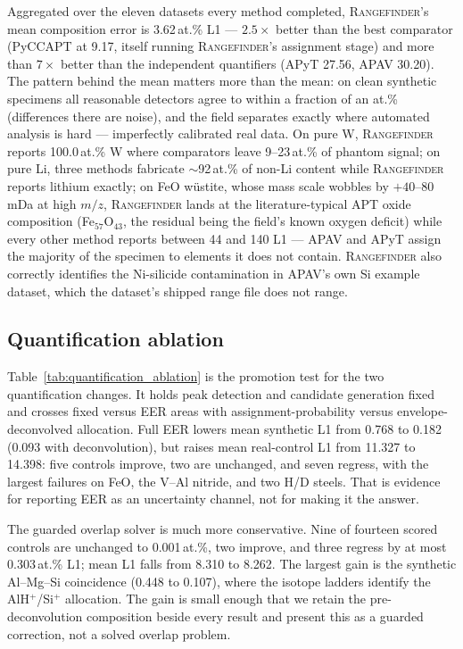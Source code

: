 \documentclass[11pt]{article}
\newcommand{\rf}{\textsc{Rangefinder}}
\begin{document}
Aggregated over the eleven datasets every method completed, \rf{}'s mean
composition error is 3.62\,at.\% L1 --- $2.5\times$ better than the best
comparator (PyCCAPT at 9.17, itself running \rf{}'s assignment stage) and
more than $7\times$ better than the independent quantifiers (APyT 27.56,
APAV 30.20). The pattern behind the mean matters more than the mean: on clean
synthetic specimens all reasonable detectors agree to within a fraction
of an at.\% (differences there are noise), and the field separates
exactly where automated analysis is hard --- imperfectly calibrated real
data. On pure W, \rf{} reports 100.0\,at.\% W where comparators leave
9--23\,at.\% of phantom signal; on pure Li, three methods fabricate
$\sim$92\,at.\% of non-Li content while \rf{} reports lithium exactly;
on FeO w\"ustite, whose mass scale wobbles by $+40$--$80$\,mDa at high
$m/z$, \rf{} lands at the literature-typical APT oxide composition
(Fe$_{57}$O$_{43}$, the residual being the field's known oxygen deficit)
while every other method reports between 44 and 140 L1 --- APAV and APyT
assign the majority of the specimen to elements it does not contain.
\rf{} also correctly identifies the Ni-silicide contamination in APAV's
own Si example dataset, which the dataset's shipped range file does not
range.

\subsection{Quantification ablation}
Table~\ref{tab:quantification_ablation} is the promotion test for the two
quantification changes. It holds peak detection and candidate generation
fixed and crosses fixed versus EER areas with assignment-probability versus
envelope-deconvolved allocation. Full EER lowers mean synthetic L1 from
0.768 to 0.182 (0.093 with deconvolution), but raises mean real-control L1
from 11.327 to 14.398: five controls improve, two are unchanged, and seven
regress, with the largest failures on FeO, the V--Al nitride, and two H/D
steels. That is evidence for reporting EER as an uncertainty channel, not
for making it the answer.

The guarded overlap solver is much more conservative. Nine of fourteen
scored controls are unchanged to 0.001\,at.\%, two improve, and three regress
by at most 0.303\,at.\% L1; mean L1 falls from 8.310 to 8.262. The largest
gain is the synthetic Al--Mg--Si coincidence (0.448 to 0.107), where the
isotope ladders identify the AlH$^+$/Si$^+$ allocation. The gain is small
enough that we retain the pre-deconvolution composition beside every result
and present this as a guarded correction, not a solved overlap problem.
\end{document}

